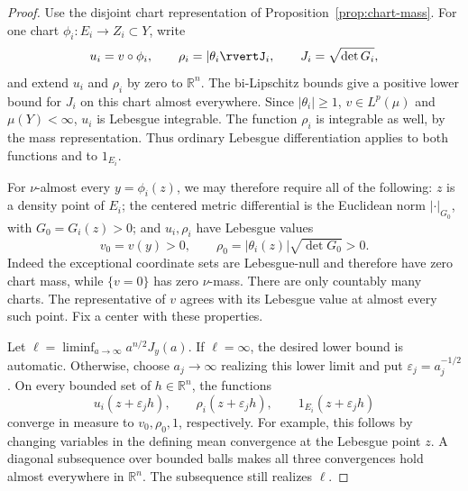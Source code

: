 \documentclass[11pt]{article}
\numberwithin{equation}{section}
\theoremstyle{definition}
\theoremstyle{remark}
\begin{document}
\begin{proof}
Use the disjoint chart representation of
Proposition~\ref{prop:chart-mass}. For one chart
$\phi_i:E_i\to Z_i\subset Y$, write
\[
 u_i=v\circ\phi_i,
 \qquad \rho_i=\lvert \theta_i\rvertJ_i,
 \qquad J_i=\sqrt{\det G_i},
\]
and extend $u_i$ and $\rho_i$ by zero to $\mathbb R^n$. The
bi-Lipschitz bounds give a positive lower bound for $J_i$ on
this chart almost everywhere. Since $\lvert \theta_i\rvert\ge1$,
$v\in L^p(\mu)$ and $\mu(Y)<\infty$, $u_i$ is Lebesgue
integrable. The function $\rho_i$ is integrable as well, by
the mass representation. Thus ordinary Lebesgue differentiation
applies to both functions and to $1_{E_i}$.

For $\nu$-almost every $y=\phi_i(z)$, we may therefore require
all of the following: $z$ is a density point of $E_i$; the centered
metric differential is the Euclidean norm $\lvert \cdot\rvert_{G_0}$,
with $G_0=G_i(z)>0$; and $u_i,\rho_i$ have Lebesgue values
\begin{equation}\label{chord:lebesgue-values}
 v_0=v(y)>0,
 \qquad \rho_0=\lvert \theta_i(z)\rvert\sqrt{\det G_0}>0.
\end{equation}
Indeed the exceptional coordinate sets are Lebesgue-null and
therefore have zero chart mass, while $\{v=0\}$ has zero
$\nu$-mass. There are only countably many charts. The representative
of $v$ agrees with its Lebesgue value at almost every such point.
Fix a center with these properties.

Let $\ell=\liminf_{a\to\infty}a^{n/2}J_y(a)$. If
$\ell=\infty$, the desired lower bound is automatic. Otherwise,
choose $a_j\to\infty$ realizing this lower limit and put
$\varepsilon_j=a_j^{-1/2}$. On every bounded set of
$h\in\mathbb R^n$, the functions
\[
 u_i(z+\varepsilon_jh),\qquad
 \rho_i(z+\varepsilon_jh),\qquad
 1_{E_i}(z+\varepsilon_jh)
\]
converge in measure to $v_0,\rho_0,1$, respectively. For example,
this follows by changing variables in the defining mean convergence
at the Lebesgue point $z$. A diagonal subsequence over bounded
balls makes all three convergences hold almost everywhere in
$\mathbb R^n$. The subsequence still realizes $\ell$.


\end{proof}
\end{document}
